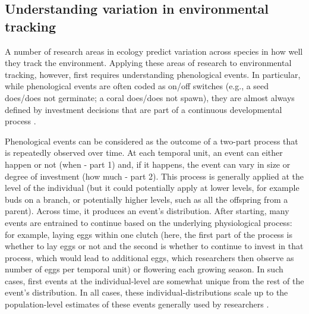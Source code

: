 \documentclass[11pt,letterpaper]{article}
\newcommand{\R}[1]{\label{#1}\linelabel{#1}}
\begin{document}
\subsection{Understanding variation in environmental tracking}
A number of research areas in ecology predict variation across species in how well they track the environment. Applying these areas of research to environmental tracking, however, first requires understanding phenological events. In particular, while phenological events are often coded as on/off switches (e.g., a seed does/does not germinate; a coral does/does not spawn), they are almost always defined by investment decisions that are part of a continuous developmental process \citep{inouye2019}. 

\R{whenhow1start}Phenological events can be considered as the outcome of a two-part process that is repeatedly observed over time. At each temporal unit, an event can either happen or not (when - part 1) and, if it happens, the event can vary in size or degree of investment (how much - part 2). This process is generally applied at the level of the individual (but it could potentially apply at lower levels, for example buds on a branch, or potentially higher levels, such as all the offspring from a parent). Across time, it produces an event's distribution. After starting, many events are entrained to continue based on the underlying physiological process: for example, laying eggs within one clutch (here, the first part of the process is whether to lay eggs or not and the second is whether to continue to invest in that process, which would lead to additional eggs, which researchers then observe as number of eggs per temporal unit) or flowering each growing season. In such cases, first events at the individual-level are somewhat unique from the rest of the event's distribution. In all cases, these individual-distributions scale up to the population-level estimates of these events generally used by researchers \citep[see][for discussion of the outcomes of this scaling]{inouye2019}.\R{enddistrib}
\end{document}
